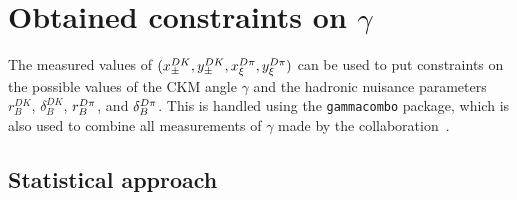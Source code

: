 
\section{\texorpdfstring{Obtained constraints on $\gamma$}{Obtained constraints on gamma}} %
\label{sec:constraints_on_gamma}

The measured values of $(x_\pm^{{D}{K}}, y_\pm^{{D}{K}}, x_\xi^{{D}\pi}, y_\xi^{{D}\pi})$ can be used to put constraints on the possible values of the CKM angle $\gamma$ and the hadronic nuisance parameters $r_B^{DK}$, $\delta_B^{DK}$, $r_B^{{D}\pi}$, and $\delta_B^{{D}\pi}$. This is handled using the \texttt{gammacombo} package, which is also used to combine all measurements of $\gamma$ made by the \lhcb collaboration~\cite{gammacombo,LHCb-PAPER-2016-032}.

\subsection{Statistical approach} %
\label{sub:statistical_approach}


